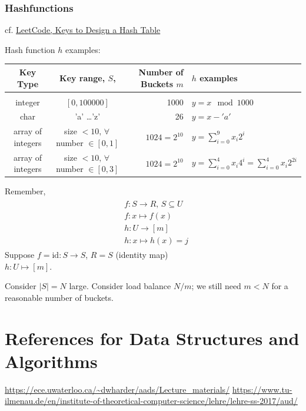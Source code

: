 \documentclass[10pt]{amsart}
\begin{document}
\subsubsection{Hashfunctions}

cf. \href{https://leetcode.com/explore/learn/card/hash-table/182/practical-applications/1110/}{LeetCode, Keys to Design a Hash Table}

Hash function $h$ examples:

\begin{center}
	\begin{tabular}{ c  c  r  l }
		Key Type & Key range, $S$, & Number of Buckets $m$ & $h$ examples \\ \hline \\
		integer & $[0, 100000]$ & 1000 & $y = x \mod{1000} $ \\
		char & 'a' \dots 'z' & 26 & $ y = x - 'a'$ \\ 
		array of integers & size $< 10, \, \forall \,$ number $\in [0,1]$ & $1024=2^{10}$ & $ y = \sum_{i=0}^9 x_i 2^i$ \\
		array of integers & size $< 10, \, \forall \, $ number $\in [0,3 ]$ & $1024 = 2^{10}$ & $y = \sum_{i=0}^4 x_i 4^i = \sum_{i=0}^4 x_i 2^{2i}$ 
	\end{tabular}
\end{center}

Remember,
\begin{equation}
\boxed{
	\begin{gathered}
	\begin{aligned}
	& f:S \to R, \, S \subseteq U \\ 
	& f:x \mapsto f(x) \\
	& h:U\to [m] \\ 
	& h:x \mapsto h(x) = j
	\end{aligned}
	\end{gathered} }
\end{equation}
Suppose $f= \text{id}: S \to S$, $R=S$ (identity map) \\
$h:U \mapsto [m] $.

Consider $|S| = N$ large. Consider load balance $N/m $; we still need $m < N$ for a reasonable number of buckets.


\section{References for Data Structures and Algorithms}

\url{https://ece.uwaterloo.ca/~dwharder/aads/Lecture_materials/}
\url{https://www.tu-ilmenau.de/en/institute-of-theoretical-computer-science/lehre/lehre-ss-2017/aud/}
\end{document}
